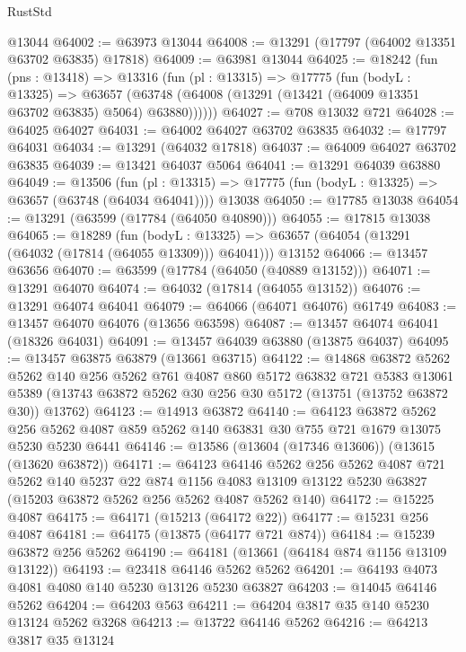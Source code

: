 \begin{lexlean}{RustStd}
\begin{coremodule}
    @13044
@64002 := @63973 @13044
@64008 := @13291 (@17797 (@64002 @13351 @63702 @63835) @17818)
@64009 := @63981 @13044
@64025 := @18242
    (fun (pns : @13418) =>
    @13316
      (fun (pl : @13315) =>
      @17775
        (fun (bodyL : @13325) =>
        @63657 (@63748 (@64008 (@13291 (@13421 (@64009 @13351 @63702 @63835) @5064) @63880))))))
@64027 := @708 @13032 @721
@64028 := @64025 @64027
@64031 := @64002 @64027 @63702 @63835
@64032 := @17797 @64031
@64034 := @13291 (@64032 @17818)
@64037 := @64009 @64027 @63702 @63835
@64039 := @13421 @64037 @5064
@64041 := @13291 @64039 @63880
@64049 := @13506
    (fun (pl : @13315) => @17775 (fun (bodyL : @13325) => @63657 (@63748 (@64034 @64041))))
    @13038
@64050 := @17785 @13038
@64054 := @13291 (@63599 (@17784 (@64050 @40890)))
@64055 := @17815 @13038
@64065 := @18289
    (fun (bodyL : @13325) => @63657 (@64054 (@13291 (@64032 (@17814 (@64055 @13309))) @64041)))
    @13152
@64066 := @13457 @63656
@64070 := @63599 (@17784 (@64050 (@40889 @13152)))
@64071 := @13291 @64070
@64074 := @64032 (@17814 (@64055 @13152))
@64076 := @13291 @64074 @64041
@64079 := @64066 (@64071 @64076) @61749
@64083 := @13457 @64070 @64076 (@13656 @63598)
@64087 := @13457 @64074 @64041 (@18326 @64031)
@64091 := @13457 @64039 @63880 (@13875 @64037)
@64095 := @13457 @63875 @63879 (@13661 @63715)
@64122 := @14868
    @63872
    @5262
    @5262
    @140
    @256
    @5262
    @761
    @4087
    @860
    @5172
    @63832
    @721
    @5383
    @13061
    @5389
    (@13743 @63872 @5262 @30 @256 @30 @5172 (@13751 (@13752 @63872 @30)) @13762)
@64123 := @14913 @63872
@64140 := @64123
    @63872
    @5262
    @256
    @5262
    @4087
    @859
    @5262
    @140
    @63831
    @30
    @755
    @721
    @1679
    @13075
    @5230
    @5230
    @6441
@64146 := @13586 (@13604 (@17346 @13606)) (@13615 (@13620 @63872))
@64171 := @64123
    @64146
    @5262
    @256
    @5262
    @4087
    @721
    @5262
    @140
    @5237
    @22
    @874
    @1156
    @4083
    @13109
    @13122
    @5230
    @63827
    (@15203 @63872 @5262 @256 @5262 @4087 @5262 @140)
@64172 := @15225 @4087
@64175 := @64171 (@15213 (@64172 @22))
@64177 := @15231 @256 @4087
@64181 := @64175 (@13875 (@64177 @721 @874))
@64184 := @15239 @63872 @256 @5262
@64190 := @64181 (@13661 (@64184 @874 @1156 @13109 @13122))
@64193 := @23418 @64146 @5262 @5262
@64201 := @64193 @4073 @4081 @4080 @140 @5230 @13126 @5230 @63827
@64203 := @14045 @64146 @5262
@64204 := @64203 @563
@64211 := @64204 @3817 @35 @140 @5230 @13124 @5262 @3268
@64213 := @13722 @64146 @5262
@64216 := @64213 @3817 @35 @13124

\end{coremodule}
\end{lexlean}
